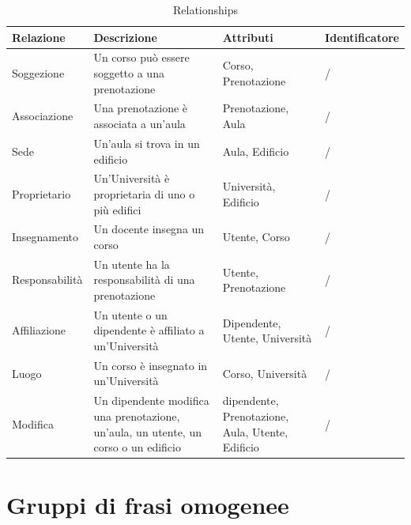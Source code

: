 \documentclass[a4paper, 10pt, oneside]{article} %
\begin{document}
\begin{table}[H]
\begin{tabular}{m{3cm} | m{6cm}| m{3cm} | m{2.5cm} }

\textbf{Relazione} & \textbf{Descrizione} & \textbf{Attributi} & \textbf{Identificatore}\\

\hline

Soggezione & Un corso può essere soggetto a una prenotazione & Corso, Prenotazione & / \\

\hline

Associazione & Una prenotazione è associata a un'aula & Prenotazione, Aula & /  \\

\hline

Sede & Un'aula si trova in un edificio & Aula, Edificio &   / \\

\hline

Proprietario & Un'Università è proprietaria di uno o più edifici & Università, Edificio & / \\

\hline

Insegnamento & Un docente insegna un corso & Utente, Corso & / \\

\hline

Responsabilità& Un utente ha la responsabilità di una prenotazione & Utente, Prenotazione & / \\

\hline

Affiliazione & Un utente o un dipendente è affiliato a un'Università&Dipendente, Utente, Università & / \\

\hline

Luogo & Un corso è insegnato in un'Università & Corso, Università & / \\

\hline

Modifica & Un dipendente modifica una prenotazione, un'aula, un utente, un corso o un edificio & dipendente, Prenotazione, Aula, Utente, Edificio & / \\


\end{tabular}
\caption{Relationships}

\end{table}

\section{Gruppi di frasi omogenee}
\end{document}
